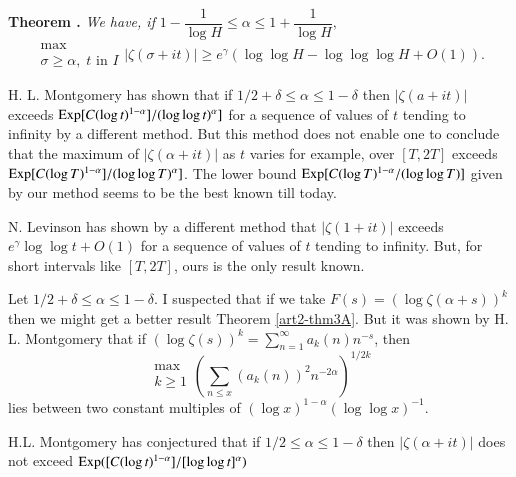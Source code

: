 \noindent
{\bfseries Theorem .\label{art2-thm3B}} \textit{We have, if} $1 - \dfrac{1}{\log H} \leqslant \alpha \leqslant 1 + \dfrac{1}{\log H}$,
$$
\begin{matrix}
\max\\
\sigma \geqslant \alpha, \; t \text{ in } I
\end{matrix} |\zeta(\sigma + it)| \geqslant e^\gamma (\log \log H - \log \log \log H + O (1)).
$$

\begin{remark}\label{art2-rem1}
H. L. Montgomery \cite{art2-key9} has shown that if $1/2 + \delta \leqslant \alpha \leqslant 1 - \delta$ then $|\zeta(a+ it)|$ exceeds $\operatorname{Exp} [C(\log t)^{1-\alpha}]/(\log \log t)^{\alpha}]$ for a sequence of values of $t$ tending to infinity by a different method. But this method does not enable one to conclude that the maximum of $|\zeta (\alpha + it)|$ as $t$ varies for example, over $[T, 2T]$ exceeds $\operatorname{Exp} [C(\log T)^{1-\alpha}] / (\log \log T)^\alpha]$. The lower bound $\operatorname{Exp} [C(\log T)^{1-\alpha}/(\log \log T)]$ given by our method seems to be the best known till today.
\end{remark}

\begin{remark}\label{art2-rem2}
N. Levinson\pageoriginale \cite{art2-key8} has shown by a different method that $|\zeta(1+it)|$ exceeds $e^\gamma \log \log t + O(1)$ for a sequence of values of $t$ tending to infinity. But, for short intervals like $[T, 2T]$, ours is the only result known.
\end{remark}

\begin{remark}\label{art2-rem3}
Let $1/2 + \delta \leqslant \alpha \leqslant 1 -\delta$. I suspected that if we take $F(s) = (\log \zeta (\alpha + s))^k$ then we might get a better result Theorem \ref{art2-thm3A}. But it was shown by H. L. Montgomery \cite{art2-key10} that if $(\log \zeta(s))^k = \sum\limits^\infty_{n=1} a_k(n) n^{-s}$, then 
$$
\begin{matrix}
\max\\
k \geqslant 1 
\end{matrix}
\left(
\sum\limits_{n \leqslant x} (a_k (n))^2 n^{-2\alpha} \right)^{1/2k}
$$
lies between two constant multiples of $(\log x)^{1-\alpha} (\log \log x)^{-1}$.
\end{remark}

\begin{remark}\label{art2-rem4}
H.L. Montgomery has conjectured \cite{art2-key9} that if $1/2 \leqslant \alpha \leqslant 1 -\delta$ then $|\zeta (\alpha + it)|$ does not exceed $\operatorname{Exp} ([C (\log t)^{1-\alpha}]/[\log \log t]^{\alpha})$
\end{remark}


